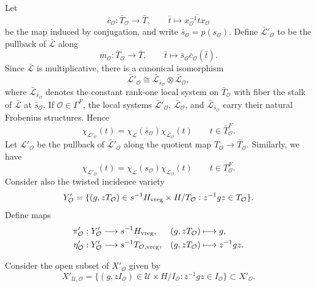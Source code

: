 \documentclass[11pt,letterpaper]{amsart}
\theoremstyle{definition}
\numberwithin{equation}{section}
\numberwithin{theorem}{section}
\begin{document}
Let
\[
 \bar c_{\mathcal O}:\bar T_{\mathcal O}\longrightarrow\bar T,
 \qquad
 \bar t\longmapsto
 \overline{x_{\mathcal O}^{-1}t x_{\mathcal O}}
\]
be the map induced by conjugation, and write
\(\bar s_{\mathcal O}=p(s_{\mathcal O})\). Define
\(\bar{\mathcal L}'_{\mathcal O}\) to be the pullback of
\(\bar{\mathcal L}\) along
\[
 m_{\mathcal O}:\bar T_{\mathcal O}\longrightarrow\bar T,
 \qquad
 \bar t\longmapsto \bar s_{\mathcal O}\bar c_{\mathcal O}(\bar t).
\]
Since \(\bar{\mathcal L}\) is multiplicative, there is a canonical
isomorphism
\begin{equation}\label{Ltw}
 \bar{\mathcal L}'_{\mathcal O}
 \cong
 \bar{\mathcal L}_{\bar s_{\mathcal O}}
 \otimes \bar{\mathcal L}_{\mathcal O},
\end{equation}
where \(\bar{\mathcal L}_{\bar s_{\mathcal O}}\) denotes the constant
rank-one local system on \(\bar T_{\mathcal O}\) with fiber the stalk of
\(\bar{\mathcal L}\) at \(\bar s_{\mathcal O}\).
If \(\mathcal O\in\Gamma^F\), the local systems
$\bar{\mathcal{L}}'_\mathcal{O}$,
$\bar{\mathcal{L}}_{\mathcal{O}}$, and
$\bar{\mathcal{L}}_{\bar{s}_{\mathcal O}}$ carry their natural
Frobenius structures. Hence
\begin{equation*}
 \chi_{\bar{\mathcal L}'_{\mathcal O}}(t)
 =\chi_{\bar{\mathcal L}}(\bar{s}_{\mathcal O})
  \chi_{\bar{\mathcal L}_{\mathcal O}}(t)
 \qquad t\in \bar{T}_{\mathcal O}^F.
\end{equation*}
Let ${\mathcal{L}}'_{\mathcal{O}}$ be the pullback of
$\bar{\mathcal L}'_{\mathcal O}$ along the quotient map
${T}_{\mathcal{O}}\to \bar{T}_{\mathcal{O}}$. Similarly, we have
\begin{equation*}
 \chi_{{\mathcal L}'_{\mathcal O}}(t)
 =\chi_{{\mathcal L}}(s_{\mathcal O})
  \chi_{{\mathcal L}_{\mathcal O}}(t)
 \qquad t\in {T}_{\mathcal O}^F.
\end{equation*}
Consider also the twisted incidence variety
\[
Y'_{\mathcal O}
=\{(g,zT_{\mathcal O})\in s^{-1}H_{\rm{vreg}}\times H/T_{\mathcal{O}}:
   z^{-1}gz\in T_{\mathcal O}\}.
\]
Define maps
\begin{align}
\pi'_{\mathcal{O}}:Y'_{\mathcal{O}}&\longrightarrow
s^{-1}H_{\rm{vreg}},
& (g,zT_{\mathcal O})&\longmapsto g,\notag\\
\eta'_{\mathcal{O}}:Y'_{\mathcal{O}}&\longrightarrow
s^{-1}T_{\mathcal{O},\rm{vreg}},
& (g,zT_{\mathcal O})&\longmapsto z^{-1}gz.
\end{align}


Consider the open subset of $X'_{\mathcal O}$ given by
 \[
X'_{\mathcal U,\mathcal O}
 =\{(g,zI_{\mathcal O})\in
       \mathcal U\times H/I_{\mathcal O}:
       z^{-1}gz\in I_{\mathcal O}\}\subset X'_{\mathcal{O}}.  
\]
\end{document}
